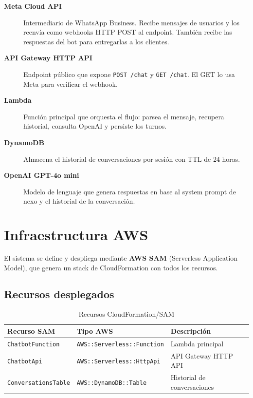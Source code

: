 \documentclass[12pt,a4paper]{article}
\begin{document}
\begin{description}
  \item[\textbf{Meta Cloud API}] Intermediario de WhatsApp Business. Recibe mensajes de usuarios y los reenvía como webhooks HTTP POST al endpoint. También recibe las respuestas del bot para entregarlas a los clientes.
  \item[\textbf{API Gateway HTTP API}] Endpoint público que expone \texttt{POST /chat} y \texttt{GET /chat}. El GET lo usa Meta para verificar el webhook.
  \item[\textbf{Lambda}] Función principal que orquesta el flujo: parsea el mensaje, recupera historial, consulta OpenAI y persiste los turnos.
  \item[\textbf{DynamoDB}] Almacena el historial de conversaciones por sesión con TTL de 24 horas.
  \item[\textbf{OpenAI GPT-4o mini}] Modelo de lenguaje que genera respuestas en base al system prompt de nexo y el historial de la conversación.
\end{description}

\section{Infraestructura AWS}

El sistema se define y despliega mediante \textbf{AWS SAM} (Serverless Application Model),
que genera un stack de CloudFormation con todos los recursos.

\subsection{Recursos desplegados}

\begin{table}[H]
\centering
\begin{tabular}{@{}lll@{}}
\toprule
\textbf{Recurso SAM} & \textbf{Tipo AWS} & \textbf{Descripción} \\
\midrule
\texttt{ChatbotFunction} & \texttt{AWS::Serverless::Function} & Lambda principal \\
\texttt{ChatbotApi} & \texttt{AWS::Serverless::HttpApi} & API Gateway HTTP API \\
\texttt{ConversationsTable} & \texttt{AWS::DynamoDB::Table} & Historial de conversaciones \\
\bottomrule
\end{tabular}
\caption{Recursos CloudFormation/SAM}
\end{table}
\end{document}
